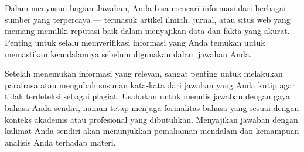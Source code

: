 %
%
%
\section{\Jawaban}


Dalam menyusun bagian Jawaban, Anda bisa mencari informasi dari berbagai sumber yang terpercaya --- termasuk artikel ilmiah, jurnal, atau situs web yang memang memiliki reputasi baik dalam menyajikan data dan fakta yang akurat. Penting untuk selalu memverifikasi informasi yang Anda temukan untuk memastikan keandalannya sebelum digunakan dalam jawaban Anda.

Setelah menemukan informasi yang relevan, sangat penting untuk melakukan parafrasa atau mengubah susunan kata-kata dari jawaban yang Anda kutip agar tidak terdeteksi sebagai plagiat. Usahakan untuk menulis jawaban dengan gaya bahasa Anda sendiri, namun tetap menjaga formalitas bahasa yang sesuai dengan konteks akademis atau profesional yang dibutuhkan. Menyajikan jawaban dengan kalimat Anda sendiri akan menunjukkan pemahaman mendalam dan kemampuan analisis Anda terhadap materi.